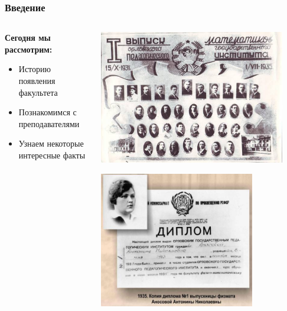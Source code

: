 \documentclass{beamer}
\begin{document}
\begin{frame}
\frametitle{\textbf{Введение}}

\begin{columns}[T] %
  \begin{column}{0.5\textwidth}
    {\Large
    \textbf{Сегодня мы рассмотрим:}

    \vspace{0.5em}


    \begin{itemize}
      \item Историю появления факультета
      \item Познакомимся с преподавателями 
      \item Узнаем некоторые интересные факты
    \end{itemize}
    }
  \end{column}

  \begin{column}{0.5\textwidth}
    \centering
    \includegraphics[width=0.9\textwidth]{1 выпуск.jpg}
    \vspace{1em}

    \includegraphics[width=0.75\textwidth]{1 диплом.jpg}
  \end{column}
\end{columns}
\end{frame}
\end{document}
